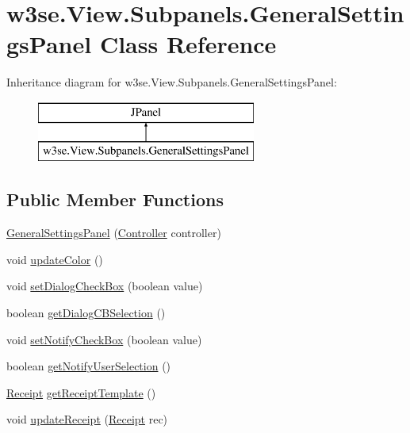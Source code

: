 \hypertarget{classw3se_1_1_view_1_1_subpanels_1_1_general_settings_panel}{\section{w3se.\-View.\-Subpanels.\-General\-Settings\-Panel Class Reference}
\label{classw3se_1_1_view_1_1_subpanels_1_1_general_settings_panel}
}
Inheritance diagram for w3se.\-View.\-Subpanels.\-General\-Settings\-Panel\-:\begin{figure}[H]
\begin{center}
\leavevmode
\includegraphics[height=2.000000cm]{classw3se_1_1_view_1_1_subpanels_1_1_general_settings_panel}
\end{center}
\end{figure}
\subsection*{Public Member Functions}
\begin{DoxyCompactItemize}
\item 
\hyperlink{classw3se_1_1_view_1_1_subpanels_1_1_general_settings_panel_a6b4767e3824a984837b94209bf2d83fb}{General\-Settings\-Panel} (\hyperlink{interfacew3se_1_1_controller_1_1_controller}{Controller} controller)
\item 
void \hyperlink{classw3se_1_1_view_1_1_subpanels_1_1_general_settings_panel_a972cf92cf0fbc19b45bb8c4d6a0ff798}{update\-Color} ()
\item 
void \hyperlink{classw3se_1_1_view_1_1_subpanels_1_1_general_settings_panel_a9c11fce351c0a7fc7641c0e3f41d71ec}{set\-Dialog\-Check\-Box} (boolean value)
\item 
boolean \hyperlink{classw3se_1_1_view_1_1_subpanels_1_1_general_settings_panel_a40b0ee7a89aa6190bc137fd89d970198}{get\-Dialog\-C\-B\-Selection} ()
\item 
void \hyperlink{classw3se_1_1_view_1_1_subpanels_1_1_general_settings_panel_a3636a521aad1a6383cc7f3ef1a0a8902}{set\-Notify\-Check\-Box} (boolean value)
\item 
boolean \hyperlink{classw3se_1_1_view_1_1_subpanels_1_1_general_settings_panel_a53186d1c42cb0176fb327b195dbeec20}{get\-Notify\-User\-Selection} ()
\item 
\hyperlink{classw3se_1_1_model_1_1_base_1_1_receipt}{Receipt} \hyperlink{classw3se_1_1_view_1_1_subpanels_1_1_general_settings_panel_a2eafbb9f3f0281f4e95e9e63ea430a90}{get\-Receipt\-Template} ()
\item 
void \hyperlink{classw3se_1_1_view_1_1_subpanels_1_1_general_settings_panel_a07aa48ede233bf56661f953b1af3f152}{update\-Receipt} (\hyperlink{classw3se_1_1_model_1_1_base_1_1_receipt}{Receipt} rec)
\end{DoxyCompactItemize}
